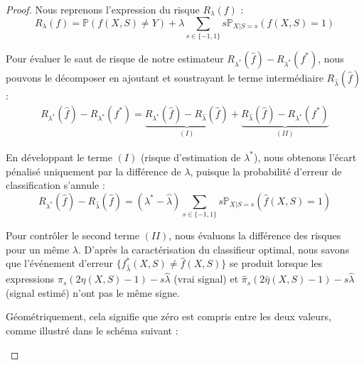 \begin{proof}
    Nous reprenons l'expression du risque $R_\lambda(f)$ :
    \begin{equation*}
        R_\lambda(f) = \mathbb{P}(f(X, S) \neq Y) + \lambda \sum_{s \in \{-1, 1\}} s \mathbb{P}_{X|S=s}(f(X, S) = 1)
    \end{equation*}

    Pour évaluer le saut de risque de notre estimateur $R_{\lambda^*}(\hat{f}) - R_{\lambda^*}(f^*)$, nous pouvons le décomposer en ajoutant et soustrayant le terme intermédiaire $R_{\hat{\lambda}}(\hat{f})$ :
    \begin{align}
        R_{\lambda^*}(\hat{f}) - R_{\lambda^*}(f^*) = \underbrace{R_{\lambda^*}(\hat{f}) - R_{\hat{\lambda}}(\hat{f})}_{(I)} + \underbrace{R_{\hat{\lambda}}(\hat{f}) - R_{\lambda^*}(f^*)}_{(II)}
    \end{align}

    En développant le terme $(I)$ (risque d'estimation de $\lambda^*$), nous obtenons l'écart pénalisé uniquement par la différence de $\lambda$, puisque la probabilité d'erreur de classification s'annule :
    \begin{equation}
        R_{\lambda^*}(\hat{f}) - R_{\hat{\lambda}}(\hat{f}) = (\lambda^* - \hat{\lambda}) \sum_{s \in \{-1, 1\}} s \mathbb{P}_{X|S=s}(\hat{f}(X, S) = 1)
    \end{equation}
    
    Pour contrôler le second terme $(II)$, nous évaluons la différence des risques pour un même $\lambda$. D'après la caractérisation du classifieur optimal, nous savons que l'événement d'erreur $\{f^*_{\hat{\lambda}}(X, S) \neq \hat{f}(X, S)\}$ se produit lorsque les expressions $\pi_s(2\eta(X,S)-1) - s\hat{\lambda}$ (vrai signal) et $\hat{\pi}_s(2\hat{\eta}(X,S)-1) - s\hat{\lambda}$ (signal estimé) n'ont pas le même signe.
    
    Géométriquement, cela signifie que zéro est compris entre les deux valeurs, comme illustré dans le schéma suivant :
    
    \begin{figure}[h]
        \centering
\end{figure}
\end{proof}
